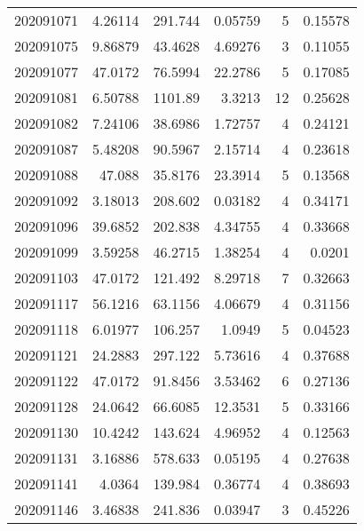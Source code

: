 \begin{tabular}{rrrrrr}
 202091071 &          4.26114 &      291.744  &            0.05759 &           5 & 0.15578 \\
 202091075 &          9.86879 &       43.4628 &            4.69276 &           3 & 0.11055 \\
 202091077 &         47.0172  &       76.5994 &           22.2786  &           5 & 0.17085 \\
 202091081 &          6.50788 &     1101.89   &            3.3213  &          12 & 0.25628 \\
 202091082 &          7.24106 &       38.6986 &            1.72757 &           4 & 0.24121 \\
 202091087 &          5.48208 &       90.5967 &            2.15714 &           4 & 0.23618 \\
 202091088 &         47.088   &       35.8176 &           23.3914  &           5 & 0.13568 \\
 202091092 &          3.18013 &      208.602  &            0.03182 &           4 & 0.34171 \\
 202091096 &         39.6852  &      202.838  &            4.34755 &           4 & 0.33668 \\
 202091099 &          3.59258 &       46.2715 &            1.38254 &           4 & 0.0201  \\
 202091103 &         47.0172  &      121.492  &            8.29718 &           7 & 0.32663 \\
 202091117 &         56.1216  &       63.1156 &            4.06679 &           4 & 0.31156 \\
 202091118 &          6.01977 &      106.257  &            1.0949  &           5 & 0.04523 \\
 202091121 &         24.2883  &      297.122  &            5.73616 &           4 & 0.37688 \\
 202091122 &         47.0172  &       91.8456 &            3.53462 &           6 & 0.27136 \\
 202091128 &         24.0642  &       66.6085 &           12.3531  &           5 & 0.33166 \\
 202091130 &         10.4242  &      143.624  &            4.96952 &           4 & 0.12563 \\
 202091131 &          3.16886 &      578.633  &            0.05195 &           4 & 0.27638 \\
 202091141 &          4.0364  &      139.984  &            0.36774 &           4 & 0.38693 \\
 202091146 &          3.46838 &      241.836  &            0.03947 &           3 & 0.45226 \\

\end{tabular}
